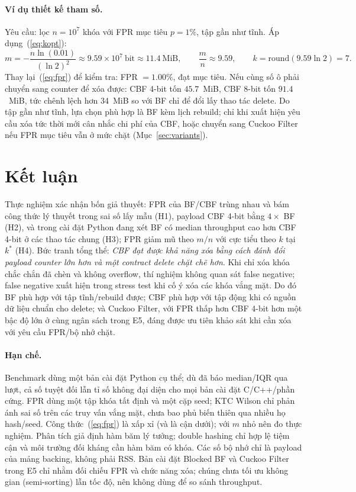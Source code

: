 \documentclass[11pt,a4paper]{article}
\begin{document}
\paragraph{Ví dụ thiết kế tham số.}
Yêu cầu: lọc $n=10^{7}$ khóa với FPR mục tiêu $p=1\%$, tập gần như tĩnh.
Áp dụng~(\ref{eq:kopt}):
\begin{equation*}
m=-\frac{n\ln(0.01)}{(\ln 2)^{2}}\approx 9.59\times10^{7}\ \text{bit}
\approx 11.4\ \text{MiB},\qquad
\frac{m}{n}\approx 9.59,\qquad
k=\mathrm{round}(9.59\ln 2)=7.
\end{equation*}
Thay lại~(\ref{eq:fpr}) để kiểm tra: FPR $=1.00\%$, đạt mục tiêu. Nếu cùng
số ô phải chuyển sang counter để xóa được: CBF 4-bit tốn $45.7$~MiB, CBF
8-bit tốn $91.4$~MiB, tức chênh lệch hơn 34~MiB so với BF chỉ để đổi lấy
thao tác delete. Do tập gần như tĩnh, lựa chọn phù hợp là BF kèm lịch rebuild;
chỉ khi xuất hiện yêu cầu xóa tức thời mới cân nhắc chi phí của CBF, hoặc
chuyển sang Cuckoo Filter nếu FPR mục tiêu vẫn ở mức chặt
(Mục~\ref{sec:variants}).

\section{Kết luận}
Thực nghiệm xác nhận bốn giả thuyết: FPR của BF/CBF trùng nhau và
bám công thức lý thuyết trong sai số lấy mẫu (H1), payload CBF 4-bit bằng
$4\times$ BF (H2), và trong cài đặt Python đang xét BF có median throughput
cao hơn CBF 4-bit ở các thao tác chung (H3); FPR giảm mũ theo $m/n$ với cực
tiểu theo $k$ tại $k^*$ (H4). Bức tranh tổng thể: \emph{CBF đạt được khả
năng xóa bằng cách đánh đổi payload counter lớn hơn và một contract delete
chặt chẽ hơn}. Khi chỉ xóa
khóa chắc chắn đã chèn và không overflow, thí nghiệm không quan sát false
negative; false negative xuất hiện trong stress test khi cố ý xóa các khóa
vắng mặt. Do đó BF phù hợp với tập tĩnh/rebuild được; CBF phù hợp với tập động
khi có nguồn dữ liệu chuẩn cho delete; và Cuckoo Filter, với FPR thấp hơn
CBF 4-bit hơn một bậc độ lớn ở cùng ngân sách trong E5, đáng được ưu tiên
khảo sát khi cần xóa
với yêu cầu FPR/bộ nhớ chặt.

\paragraph{Hạn chế.} Benchmark dùng một bản cài đặt Python cụ thể; dù đã báo
median/IQR qua \BenchRepeats{} lượt, cả số tuyệt đối lẫn tỉ số không đại diện
cho mọi bản cài đặt C/C++/phần cứng. FPR dùng một tập khóa tất định và một cặp
seed; KTC Wilson chỉ phản ánh sai số trên các truy vấn vắng mặt, chưa bao phủ
biến thiên qua nhiều họ hash/seed. Công thức~(\ref{eq:fpr}) là xấp xỉ (và là
cận dưới); với $m$ nhỏ nên đo thực nghiệm. Phân tích giả định hàm băm lý
tưởng; double hashing chỉ hợp lệ tiệm cận và môi trường đối kháng cần hàm băm
có khóa. Các số bộ nhớ chỉ là payload của mảng backing, không phải RSS. Bản
cài đặt Blocked BF và Cuckoo Filter trong E5 chỉ nhằm đối chiếu FPR và chức
năng xóa; chúng chưa tối ưu không gian (semi-sorting) lẫn tốc độ, nên không
dùng để so sánh throughput.
\end{document}
